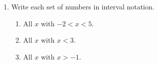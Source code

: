 \documentclass[10pt]{article}
\begin{document}
\begin{enumerate}[itemsep=12pt]
\item Write each set of numbers in interval notation.

\begin{enumerate}[label=(\alph*), itemsep=8pt]
  \item All $x$ with $-2 < x < 5$. \hfill {}
  \item All $x$ with $x < 3$. \hfill {}
  \item All $x$ with $x > -1$. \hfill {}
\end{enumerate}

\end{enumerate}
\end{document}
